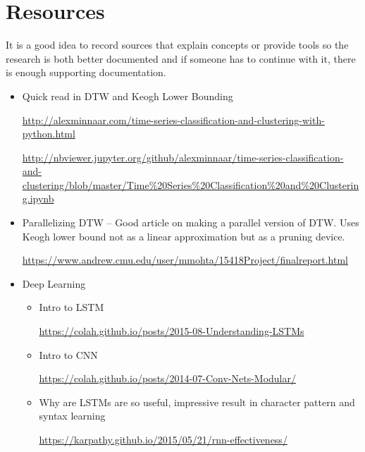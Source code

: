 \documentclass{project-logbook}
\begin{document}
{%





\clearpage
\appendix
\section{Resources}
\begin{tip}
It is a good idea to record sources that explain concepts or provide tools so the research is both better documented and if someone has to continue with it, there is enough supporting documentation.
\end{tip}
\begin{itemize}
    \item Quick read in DTW and Keogh Lower Bounding

\url{http://alexminnaar.com/time-series-classification-and-clustering-with-python.html}

\url{http://nbviewer.jupyter.org/github/alexminnaar/time-series-classification-and-clustering/blob/master/Time%20Series%20Classification%20and%20Clustering.ipynb}
    \item Parallelizing DTW -- Good article on making a parallel version of DTW. Uses Keogh lower bound not as a linear approximation but as a pruning device.

    \url{https://www.andrew.cmu.edu/user/mmohta/15418Project/finalreport.html}

    \item Deep Learning
    \begin{itemize}
        \item Intro to LSTM

        \url{https://colah.github.io/posts/2015-08-Understanding-LSTMs}
        
        \item Intro to CNN

        \url{https://colah.github.io/posts/2014-07-Conv-Nets-Modular/}

        \item Why are LSTMs are so useful, impressive result in character pattern and syntax learning

        \url{https://karpathy.github.io/2015/05/21/rnn-effectiveness/}
    \end{itemize}
\end{itemize}
}
\end{document}
